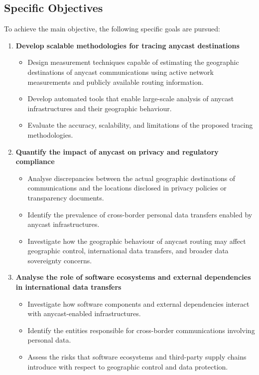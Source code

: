 \subsection{Specific Objectives}
\label{sc:introduction_objectives_specific}

To achieve the main objective, the following specific goals are pursued:

\begin{enumerate}
    \item \textbf{Develop scalable methodologies for tracing anycast destinations}
    \begin{itemize}
        \item Design measurement techniques capable of estimating the geographic destinations of anycast communications using active network measurements and publicly available routing information.
        \item Develop automated tools that enable large-scale analysis of anycast infrastructures and their geographic behaviour.
        \item Evaluate the accuracy, scalability, and limitations of the proposed tracing methodologies.
    \end{itemize}

    \item \textbf{Quantify the impact of anycast on privacy and regulatory compliance}
    \begin{itemize}
        \item Analyse discrepancies between the actual geographic destinations of communications and the locations disclosed in privacy policies or transparency documents.
        \item Identify the prevalence of cross-border personal data transfers enabled by anycast infrastructures.
        \item Investigate how the geographic behaviour of anycast routing may affect geographic control, international data transfers, and broader data sovereignty concerns.
    \end{itemize}
    
    \item \textbf{Analyse the role of software ecosystems and external dependencies in international data transfers}
    \begin{itemize}
        \item Investigate how software components and external dependencies interact with anycast-enabled infrastructures.
        \item Identify the entities responsible for cross-border communications involving personal data.
        \item Assess the risks that software ecosystems and third-party supply chains introduce with respect to geographic control and data protection.
    \end{itemize}
    

\end{enumerate}

